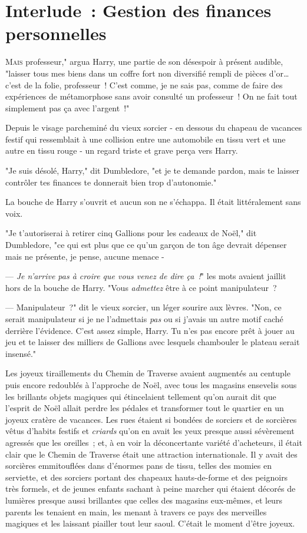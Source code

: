 \chapter{Interlude~: Gestion des finances personnelles}

\lettrine[ante=<<~]{M}{ais} professeur," argua Harry, une partie de son désespoir à présent audible, "laisser tous mes biens dans un coffre fort non diversifié rempli de pièces d'or… c'est de la folie, professeur~! C'est comme, je ne sais pas, comme de faire des expériences de métamorphose sans avoir consulté un professeur~! On ne fait tout simplement pas ça avec l'argent~!"

Depuis le visage parcheminé du vieux sorcier - en dessous du chapeau de vacances festif qui ressemblait à une collision entre une automobile en tissu vert et une autre en tissu rouge - un regard triste et grave perça vers Harry.

"Je suis désolé, Harry," dit Dumbledore, "et je te demande pardon, mais te laisser contrôler tes finances te donnerait bien trop d'autonomie."

La bouche de Harry s'ouvrit et aucun son ne s'échappa. Il était littéralement sans voix.

"Je t'autoriserai à retirer cinq Gallions pour les cadeaux de Noël," dit Dumbledore, "ce qui est plus que ce qu'un garçon de ton âge devrait dépenser mais ne présente, je pense, aucune menace -

--- \emph{Je n'arrive pas à croire que vous venez de dire ça~!}" les mots avaient jaillit hors de la bouche de Harry. "Vous \emph{admettez} être à ce point manipulateur~?

--- Manipulateur~?" dit le vieux sorcier, un léger sourire aux lèvres. "Non, ce serait manipulateur si je ne l'admettais \emph{pas} ou si j'avais un autre motif caché derrière l'évidence. C'est assez simple, Harry. Tu n'es pas encore prêt à jouer au jeu et te laisser des milliers de Gallions avec lesquels chambouler le plateau serait insensé."

\later

Les joyeux tiraillements du Chemin de Traverse avaient augmentés au centuple puis encore redoublés à l'approche de Noël, avec tous les magasins ensevelis sous les brillants objets magiques qui étincelaient tellement qu'on aurait dit que l'esprit de Noël allait perdre les pédales et transformer tout le quartier en un joyeux cratère de vacances. Les rues étaient si bondées de sorciers et de sorcières vêtus d'habits festifs et \emph{criards} qu'on en avait les yeux presque aussi sévèrement agressés que les oreilles~; et, à en voir la déconcertante variété d'acheteurs, il était clair que le Chemin de Traverse était une attraction internationale. Il y avait des sorcières emmitouflées dans d'énormes pans de tissu, telles des momies en serviette, et des sorciers portant des chapeaux hauts-de-forme et des peignoirs très formels, et de jeunes enfants sachant à peine marcher qui étaient décorés de lumières presque aussi brillantes que celles des magasins eux-mêmes, et leurs parents les tenaient en main, les menant à travers ce pays des merveilles magiques et les laissant piailler tout leur saoul. C'était le moment d'être joyeux.

